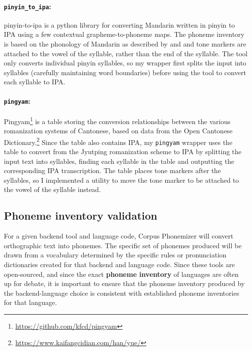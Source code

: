 \paragraph{\texttt{pinyin\_to\_ipa}:} pinyin-to-ipa \citep{taubert_2024_pinyin-to-ipa_2024} is a python library for converting Mandarin written in pinyin to IPA using a few contextual grapheme-to-phoneme maps. The phoneme inventory is based on the phonology of Mandarin as described by \cite{lin2007sounds} and \cite{duanmu2007phonology} and tone markers are attached to the vowel of the syllable, rather than the end of the syllable. The tool only converts individual pinyin syllables, so my wrapper first splits the input into syllables (carefully maintaining word boundaries) before using the tool to convert each syllable to IPA.

\paragraph{\texttt{pingyam}:} Pingyam\footnote{\url{https://github.com/kfcd/pingyam}} is a table storing the conversion relationships between the various romanization systems of Cantonese, based on data from the Open Cantonese Dictionary.\footnote{\url{https://www.kaifangcidian.com/han/yue/}} Since the table also contains IPA, my \texttt{pingyam} wrapper uses the table to convert from the Jyutping romanization scheme to IPA by splitting the input text into syllables, finding each syllable in the table and outputting the corresponding IPA transcription. The table places tone markers after the syllables, so I implemented a utility to move the tone marker to be attached to the vowel of the syllable instead.

\subsection{Phoneme inventory validation}
\label{sec:dataset-folding}

For a given backend tool and language code, Corpus Phonemizer will convert orthographic text into phonemes. The specific set of phonemes produced will be drawn from a vocabulary determined by the specific rules or pronunciation dictionaries created for that backend and language code. Since these tools are open-sourced, and since the exact \textbf{phoneme inventory} of languages are often up for debate, it is important to ensure that the phoneme inventory produced by the backend-language choice is consistent with established phoneme inventories for that language.

